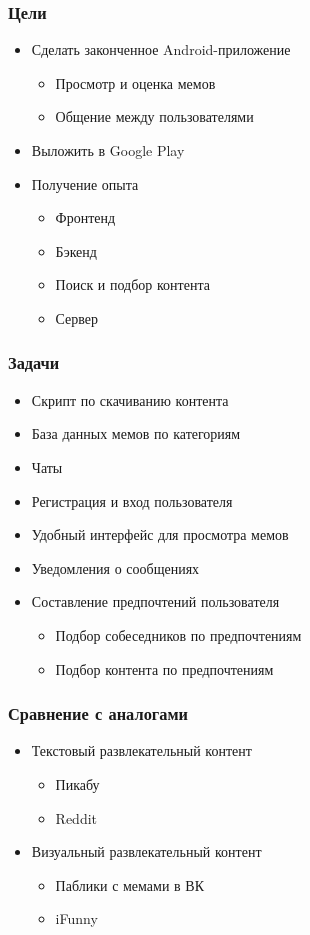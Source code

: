 \documentclass[xetex,mathserif,serif, xcolor=table]{beamer}
\begin{document}
	\begin{frame}
		\frametitle{Цели}
			\begin{itemize}
		 		\item Сделать законченное Android-приложение
		 		    \begin{itemize}
    			    	\item Просмотр и оценка мемов
    			    	\item Общение между пользователями
    		    	\end{itemize}
		 		\item Выложить в Google Play
				\item Получение опыта
    				\begin{itemize}
    			    	\item Фронтенд
    			    	\item Бэкенд
    			    	\item Поиск и подбор контента
    			    	\item Сервер
    		    	\end{itemize}
			\end{itemize}
	\end{frame}
	
	\begin{frame}
		\frametitle{Задачи}
			\begin{itemize}
			    \item Скрипт по скачиванию контента
		 		\item База данных мемов по категориям
				\item Чаты
				\item Регистрация и вход пользователя
				\item Удобный интерфейс для просмотра мемов
				\item Уведомления о сообщениях
				\item Составление предпочтений пользователя
					\begin{itemize}
				    	\item Подбор собеседников по предпочтениям
				    	\item Подбор контента по предпочтениям
			    	\end{itemize}
			\end{itemize}
	\end{frame}	
	
	\begin{frame}
		\frametitle{Сравнение с аналогами}
			\begin{itemize}
				\item Текстовый развлекательный контент
					\begin{itemize}
				    	\item Пикабу
				    	\item Reddit
			    	\end{itemize}
			    \item Визуальный развлекательный контент
					\begin{itemize}
				    	\item Паблики с мемами в ВК
				    	\item iFunny
			    	\end{itemize}
			\end{itemize}
	\end{frame}		
	
\end{document}
